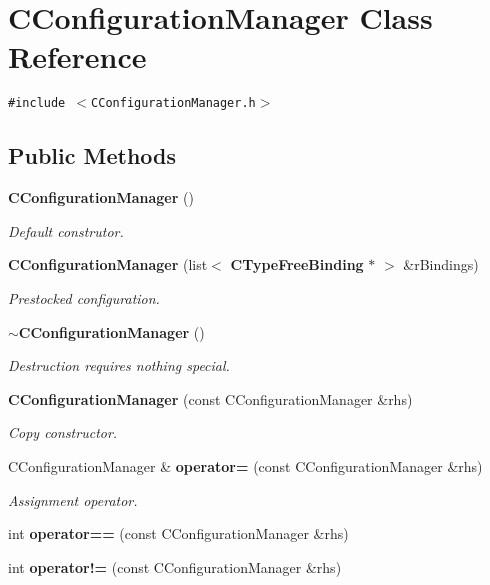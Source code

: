 \section{CConfiguration\-Manager  Class Reference}
\label{classCConfigurationManager}
{\tt \#include $<$CConfiguration\-Manager.h$>$}

\subsection*{Public Methods}
\begin{CompactItemize}
\item 
{\bf CConfiguration\-Manager} ()
\begin{CompactList}\small\item\em Default construtor.\item\end{CompactList}\item 
{\bf CConfiguration\-Manager} (list$<$ {\bf CType\-Free\-Binding} $\ast$ $>$ \&r\-Bindings)
\begin{CompactList}\small\item\em Prestocked configuration.\item\end{CompactList}\item 
{\bf $\sim$CConfiguration\-Manager} ()
\begin{CompactList}\small\item\em Destruction requires nothing special.\item\end{CompactList}\item 
{\bf CConfiguration\-Manager} (const CConfiguration\-Manager \&rhs)
\begin{CompactList}\small\item\em Copy constructor.\item\end{CompactList}\item 
CConfiguration\-Manager \& {\bf operator=} (const CConfiguration\-Manager \&rhs)
\begin{CompactList}\small\item\em Assignment operator.\item\end{CompactList}\item 
int {\bf operator==} (const CConfiguration\-Manager \&rhs)
\item 
int {\bf operator!=} (const CConfiguration\-Manager \&rhs)

\end{CompactItemize}
